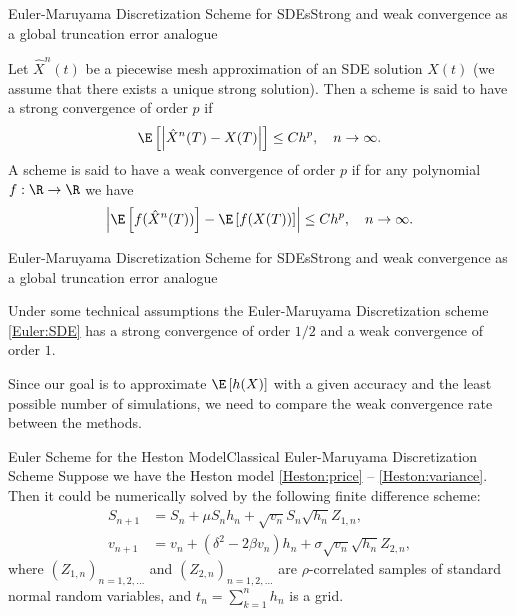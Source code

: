 \begin{frame}{Euler-Maruyama Discretization Scheme for SDEs}{Strong and weak convergence as a global truncation error analogue}
    \begin{definition}
        Let $\hat X^n(t)$ be a piecewise mesh approximation of an SDE solution $X(t)$ (we assume that there exists a unique strong solution). 
        Then a scheme is said to have a strong convergence of order $p$ if 
        \begin{equation}
            \E\left[\left|\hat X^n(T) - X(T)\right|\right] \leq Ch^p, \quad n \to \infty.
        \end{equation}
        A scheme is said to have a weak convergence of order $p$ if for any polynomial $f: \R \to \R$ we have
        \begin{equation}
            \left|\E\left[f(\hat X^n(T))\right] - \E\left[f(X(T))\right]\right| \leq Ch^p, \quad n \to \infty.
        \end{equation}
    \end{definition}
    
\end{frame}

\begin{frame}{Euler-Maruyama Discretization Scheme for SDEs}{Strong and weak convergence as a global truncation error analogue}
    \begin{theorem}
        Under some technical assumptions the Euler-Maruyama Discretization scheme \eqref{Euler:SDE} has a strong convergence of order $1/2$ and a weak convergence of order $1$.
    \end{theorem}

    \begin{nb}
        Since our goal is to approximate $\E\left[h(X)\right]$ with a given accuracy and the least possible number of simulations, we need to compare the weak convergence rate between the methods.
    \end{nb}
\end{frame}

\begin{frame}{Euler Scheme for the Heston Model}{Classical Euler-Maruyama Discretization Scheme}
    Suppose we have the Heston model \eqref{Heston:price} -- \eqref{Heston:variance}. Then it could be numerically solved by the following finite difference scheme:
    \begin{align}
        S_{n+1} & = S_n + \mu S_n h_n + \sqrt{v_n} S_n \sqrt{h_n} Z_{1,n}, \label{Euler:Heston:price}\\
        v_{n+1} & = v_n + \left(\delta^2 - 2\beta v_n\right) h_n + \sigma \sqrt{v_n} \sqrt{h_n} Z_{2,n}, \label{Euler:Heston:variance}
    \end{align}
    where $(Z_{1,n})_{n=1, 2, \dots}$ and $(Z_{2,n})_{n=1, 2, \dots}$ are $\rho$-correlated samples of standard normal random variables, and $t_n = \sum_{k=1}^n h_n$ is a grid.
\end{frame}

